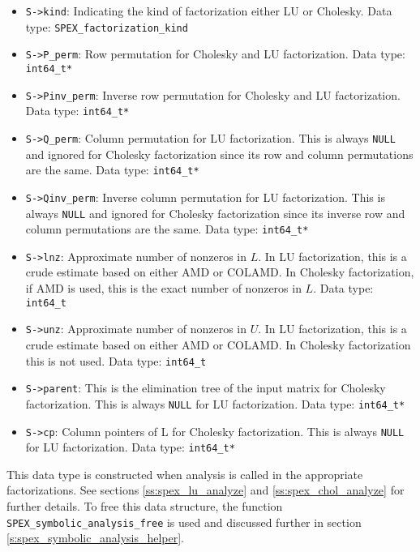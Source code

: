 \documentclass[12pt]{report}
\theoremstyle{definition}
\begin{document}
\begin{itemize}
\item \verb|S->kind|: Indicating the kind of factorization either LU or Cholesky. Data type: \verb|SPEX_factorization_kind|

\item \verb|S->P_perm|: Row permutation for Cholesky and LU factorization. Data type: \verb|int64_t*|

\item \verb|S->Pinv_perm|: Inverse row permutation for Cholesky and LU factorization. Data type: \verb|int64_t*|

\item \verb|S->Q_perm|: Column permutation for LU factorization. This is always \verb|NULL| and ignored for Cholesky factorization since its row and column permutations are the same. Data type: \verb|int64_t*|

\item \verb|S->Qinv_perm|: Inverse column permutation for LU factorization. This is always \verb|NULL| and ignored for Cholesky factorization since its inverse row and column permutations are the same. Data type: \verb|int64_t*|

\item \verb|S->lnz|: Approximate number of nonzeros in $L$. In LU factorization, this is a crude estimate based on either AMD or COLAMD. In Cholesky factorization, if AMD is used, this is the exact number of nonzeros in $L$. Data type: \verb|int64_t|

\item \verb|S->unz|: Approximate number of nonzeros in $U$. In LU factorization, this is a crude estimate based on either AMD or COLAMD. In Cholesky factorization this is not used. Data type: \verb|int64_t|

\item \verb|S->parent|: This is the elimination tree of the input matrix for Cholesky factorization. This is always \verb|NULL| for LU factorization. Data type: \verb|int64_t*|

\item \verb|S->cp|: Column pointers of L for Cholesky factorization. This is always \verb|NULL| for LU factorization. Data type: \verb|int64_t*|
\end{itemize}

This data type is constructed when analysis is called in the appropriate factorizations. See sections \ref{ss:spex_lu_analyze} and \ref{ss:spex_chol_analyze} for further details. To free this data structure, the function \verb|SPEX_symbolic_analysis_free| is used and discussed further in section \ref{s:spex_symbolic_analysis_helper}.
\end{document}
